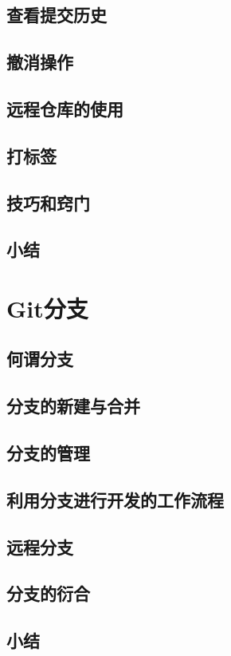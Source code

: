 \documentclass{book}
\begin{document}
	\section{查看提交历史}
	\section{撤消操作}
	\section{远程仓库的使用}
	\section{打标签}
	\section{技巧和窍门}
	\section{小结}

\chapter{Git分支}

	\section{何谓分支}
	\section{分支的新建与合并}
	\section{分支的管理}
	\section{利用分支进行开发的工作流程}
	\section{远程分支}
	\section{分支的衍合}
	\section{小结}
\end{document}
